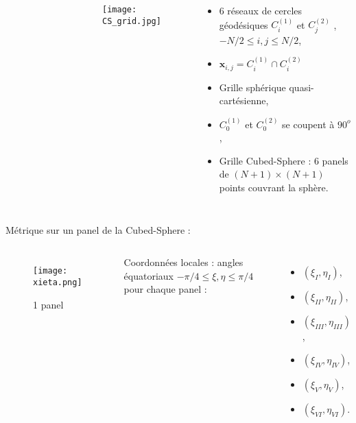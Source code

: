 \documentclass[11pt]{beamer}
\begin{document}
\begin{frame}
\begin{columns}
\tiny
\begin{figure}
\def\svgwidth{0.55 \textwidth}
\vspace{0.5cm}

\end{figure}
\begin{figure}
\begin{center}
\texttt{[image: CS\_grid.jpg]}
\end{center}
\end{figure}

\begin{itemize}
\item 6 réseaux de cercles géodésiques $C_i^{(1)}$ et $C_j^{(2)}$ , $-N/2 \leq i,j \leq N/2$,
\pause

\item $\mathbf{x}_{i,j}=C_i^{(1)} \cap C_i^{(2)}$
\pause

\item Grille sphérique quasi-cartésienne,
\pause

\item $C_0^{(1)}$ et $C_0^{(2)}$ se coupent à $90^o$,
\pause

\item Grille Cubed-Sphere : 6 panels de $(N+1) \times (N+1)$ points couvrant la sphère.
\end{itemize}
\end{columns}
\end{frame}


\begin{frame}{Métrique sur un panel de la Cubed-Sphere :}
\begin{columns}
\begin{figure}
\begin{center}
\texttt{[image: xieta.png]}
\end{center}
\caption{1 panel}
\end{figure}


Coordonnées locales : angles équatoriaux $- \pi/4 \leq \xi, \eta \leq \pi/4$ pour chaque panel :

\begin{itemize}
\item $(\xi_{I}, \eta_{I})$,

\item $(\xi_{II}, \eta_{II})$,

\item $(\xi_{III}, \eta_{III})$,

\item $(\xi_{IV}, \eta_{IV})$,

\item $(\xi_{V}, \eta_{V})$,

\item $(\xi_{VI}, \eta_{VI})$.

\end{itemize}


\end{columns}
\end{frame}
\end{document}

